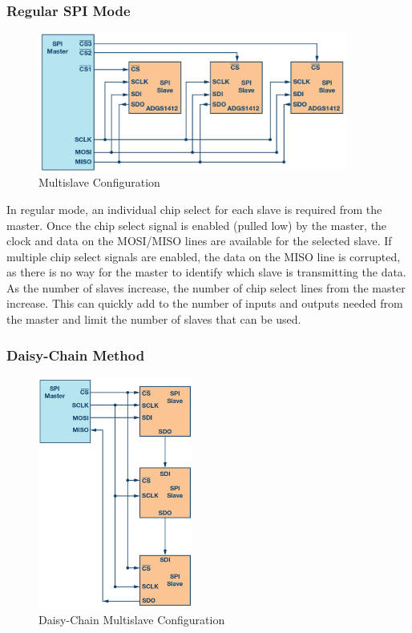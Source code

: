 \subsubsection{Regular SPI Mode}
\begin{figure}[H]
\begin{center}
\includegraphics[width=4in]{images/SPIMultiSlave.png}
\caption{Multislave Configuration}
\label{SPIMultiSlave}
\end{center}
\end{figure} 

In regular mode, an individual chip select for each slave is required from the master. Once the chip select signal is enabled (pulled low) by the master, the clock and data on the MOSI/MISO lines are available for the selected slave. If multiple chip select signals are enabled, the data on the MISO line is corrupted, as there is no way for the master to identify which slave is transmitting the data. As the number of slaves increase, the number of chip select lines from the master increase. This can quickly add to the number of inputs and outputs needed from the master and limit the number of slaves that can be used. 

\subsubsection{Daisy-Chain Method}
\begin{figure}[H]
\begin{center}
\includegraphics[width=2in]{images/SPIDaisy.png}
\caption{Daisy-Chain Multislave Configuration}
\label{SPIDaisy}
\end{center}
\end{figure} 

